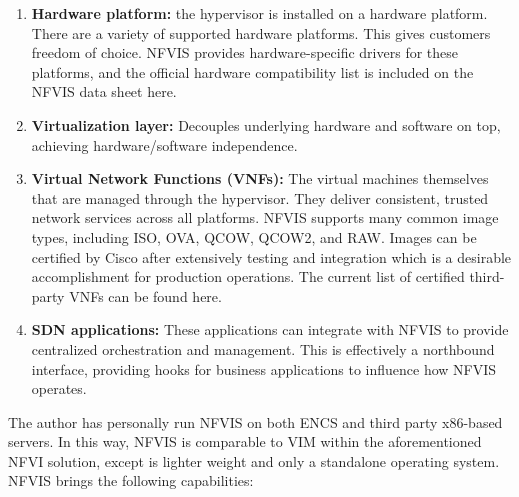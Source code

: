 \begin{enumerate}
  \item \textbf{Hardware platform:} the hypervisor is installed on a hardware
  platform. There are a variety of supported hardware platforms. This gives customers
  freedom of choice. NFVIS provides hardware-specific drivers for these
  platforms, and the official hardware compatibility list is included on the
  NFVIS data sheet here.
  \item \textbf{Virtualization layer:} Decouples underlying hardware and
  software on top, achieving hardware/software independence.
  \item \textbf{Virtual Network Functions (VNFs):} The virtual machines themselves
  that are managed through the hypervisor. They deliver consistent, trusted network
  services across all platforms. NFVIS supports many common image types,
  including ISO, OVA, QCOW, QCOW2, and RAW\@. Images can be certified by Cisco
  after extensively testing and integration which is a desirable accomplishment
  for production operations. The current list of certified third-party VNFs can
  be found here.
  \item \textbf{SDN applications:} These applications can integrate with NFVIS to
  provide centralized orchestration and management. This is effectively a
  northbound interface, providing hooks for business applications to influence
  how NFVIS operates.
\end{enumerate}

The author has personally run NFVIS on both ENCS and third party x86-based
servers. In this way, NFVIS is comparable to VIM within the aforementioned
NFVI solution, except is lighter weight and only a standalone operating
system. NFVIS brings the following capabilities:

